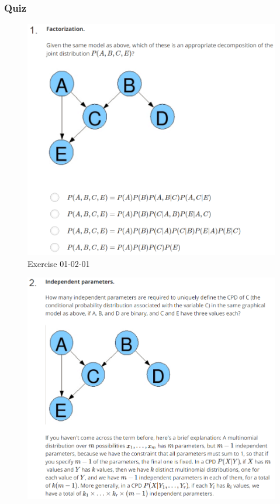 \documentclass[12pt]{article}
\numberwithin{equation}{section}
\begin{document}
\subsubsection{Quiz}
\begin{figure}[H]
	\includegraphics[width=\linewidth]{PGMpics/01-02-01.png}
	\caption{Exercise 01-02-01}
	\label{fig:01-02-01}
\end{figure}
\begin{figure}[H]
	\includegraphics[width=\linewidth]{PGMpics/01-02-02-1.png}
	\label{fig:01-02-02-1}
\end{figure}
\end{document}
